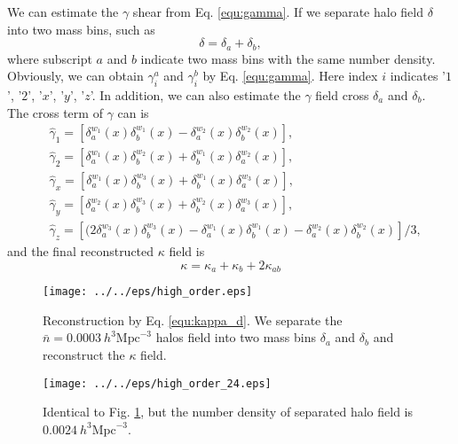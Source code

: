 We can estimate the $\gamma$ shear from Eq. \eqref{equ:gamma}. If we separate
halo field $\delta$ into two mass bins, such as
\begin{equation}
\delta=\delta_a + \delta_b,
\label{equ:h_d}
\end{equation}
where subscript $a$ and $b$ indicate two mass bins with the same number density.
Obviously, we can obtain $\gamma_{i}^{a}$ and $\gamma_{i}^{b}$ by 
Eq. \eqref{equ:gamma}. Here index $i$ indicates 
'$1$', '$2$', '$x$', '$y$', '$z$'.  In addition, 
we can also estimate the $\gamma$ field cross $\delta_{a}$ and $\delta_{b}$.\\
 The cross term of $\gamma$ can is
\begin{equation}
\label{equ:gamma_high}
\begin{split}
&\hat{\gamma}_{1}=\left[\delta^{w_{1}}_{a}(x)\delta^{w_{1}}_{b}(x)-\delta^{w_{2}}_{a}(x)\delta^{w_{2}}_{b}(x) \right],\\
&\hat{\gamma}_{2}=[\delta^{w_{1}}_{a}(x)\delta^{w_{2}}_{b}(x)
+\delta^{w_{1}}_{b}(x)\delta^{w_{2}}_{a}(x)],\\
&\hat{\gamma}_{x}=[\delta^{w_{1}}_{a}(x)\delta^{w_{3}}_{b}(x)
+\delta^{w_{1}}_{b}(x)\delta^{w_{3}}_{a}(x)],\\
&\hat{\gamma}_{y}=[\delta^{w_{2}}_{a}(x)\delta^{w_{3}}_{b}(x)
+\delta^{w_{2}}_{b}(x)\delta^{w_{3}}_{a}(x)],\\
&\hat{\gamma}_{z}=[(2\delta^{w_{3}}_{a}(x)\delta^{w_{3}}_{b}(x)
-\delta^{w_{1}}_{a}(x)\delta^{w_{1}}_{b}(x)
-\delta^{w_{2}}_{a}(x)\delta^{w_{2}}_{b}(x)]/3,
\end{split}
\end{equation}
and the final reconstructed $\kappa$ field is 
\begin{equation}
\kappa=\kappa_{a}+\kappa_{b}+2\kappa_{ab}
\label{equ:kappa_d}
\end{equation}
\begin{figure}[tbp]
\begin{center}
\texttt{[image: ../../eps/high\_order.eps]}
\end{center}
\vspace{-0.7cm}
\caption{Reconstruction by Eq. \eqref{equ:kappa_d}. We separate 
the $\bar{n}=0.0003\ h^{3}\mathrm{Mpc}^{-3}$ halos field into two mass bins $\delta_a$
and $\delta_{b}$ and reconstruct the $\kappa$ field.}
\label{fig:H_CC}
\end{figure}
\begin{figure}[tbp]
\begin{center}
\texttt{[image: ../../eps/high\_order\_24.eps]}
\end{center}
\vspace{-0.7cm}
\caption{Identical to Fig. \ref{fig:H_CC}, but the number density of separated
halo field is $0.0024\ h^{3}\mathrm{Mpc}^{-3}$.}
\label{fig:H_CC_24}
\end{figure}

